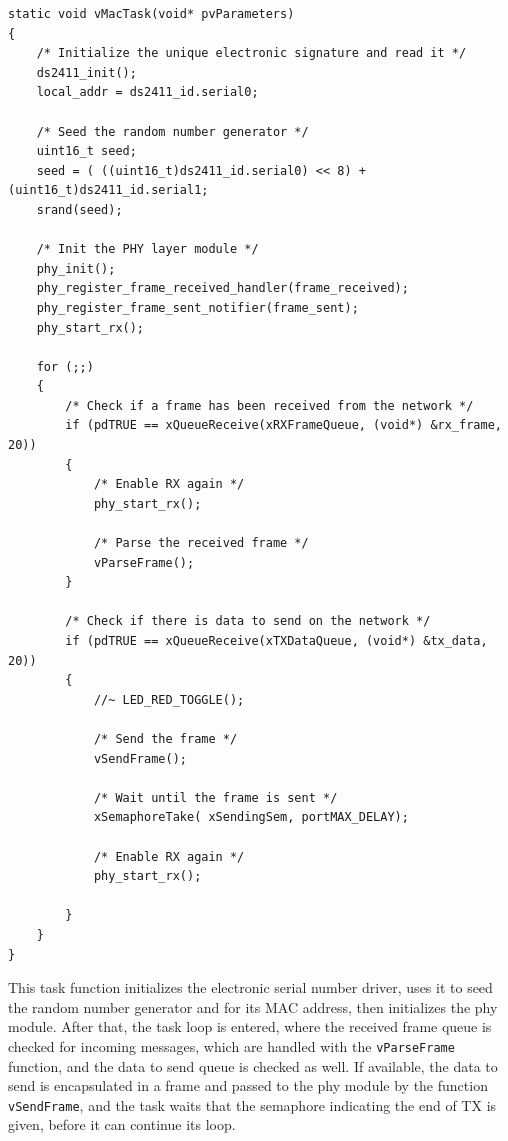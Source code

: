 \documentclass[11pt]{report}
\begin{document}
\begin{verbatim}
static void vMacTask(void* pvParameters)
{
    /* Initialize the unique electronic signature and read it */
    ds2411_init();
    local_addr = ds2411_id.serial0;
    
    /* Seed the random number generator */
    uint16_t seed;
    seed = ( ((uint16_t)ds2411_id.serial0) << 8) + (uint16_t)ds2411_id.serial1;
    srand(seed);
    
    /* Init the PHY layer module */ 
    phy_init();
    phy_register_frame_received_handler(frame_received);
    phy_register_frame_sent_notifier(frame_sent);
    phy_start_rx();
    
    for (;;)
    {
        /* Check if a frame has been received from the network */
        if (pdTRUE == xQueueReceive(xRXFrameQueue, (void*) &rx_frame, 20))
        {
            /* Enable RX again */
            phy_start_rx();
            
            /* Parse the received frame */
            vParseFrame();
        }
        
        /* Check if there is data to send on the network */
        if (pdTRUE == xQueueReceive(xTXDataQueue, (void*) &tx_data, 20))
        {
            //~ LED_RED_TOGGLE();
            
            /* Send the frame */
            vSendFrame();
            
            /* Wait until the frame is sent */
            xSemaphoreTake( xSendingSem, portMAX_DELAY);
            
            /* Enable RX again */
            phy_start_rx();
            
        }
    }
}
\end{verbatim}
This task function initializes the electronic serial number driver, uses it to seed the random number generator and for its MAC address, then initializes the phy module.
After that, the task loop is entered, where the received frame queue is checked for incoming messages, which are handled with the \verb$vParseFrame$ function, and the data to send queue is checked as well. If available, the data to send is encapsulated in a frame and passed to the phy module by the function \verb$vSendFrame$, and the task waits that the semaphore indicating the end of TX is given, before it can continue its loop.
\end{document}

